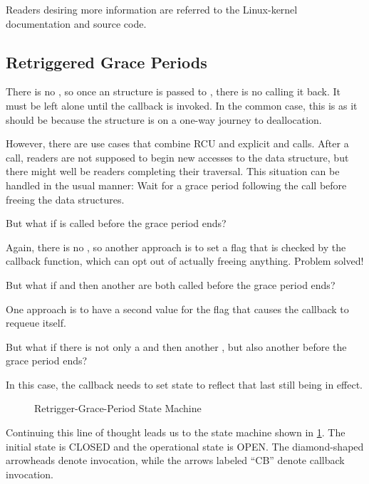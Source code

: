 Readers desiring more  information are referred to
the Linux-kernel documentation and source code.

\subsection{Retriggered Grace Periods}
\label{sec:together:Retriggered Grace Periods}

There is no , so once an  structure
is passed to , there is no calling it back.
It must be left alone until the callback is invoked.
In the common case, this is as it should be because the 
structure is on a one-way journey to deallocation.

However, there are use cases that combine RCU and explicit 
and  calls.
After a  call, readers are not supposed to begin new accesses
to the data structure, but there might well be readers completing their
traversal.
This situation can be handled in the usual manner:
Wait for a grace period following the  call before freeing
the data structures.

But what if  is called before the grace period ends?

Again, there is no , so another approach is to
set a flag that is checked by the callback function, which can opt out
of actually freeing anything.
Problem solved!

But what if  and then another  are both called
before the grace period ends?

One approach is to have a second value for the flag that causes the
callback to requeue itself.

But what if there is not only a  and then another ,
but also another  before the grace period ends?

In this case, the callback needs to set state to reflect that last
 still being in effect.

\begin{figure}
\centering
{}
\caption{Retrigger-Grace-Period State Machine}
\label{fig:count:Retrigger-Grace-Period State Machine}
\end{figure}

Continuing this line of thought leads us to the state machine
shown in \cref{fig:count:Retrigger-Grace-Period State Machine}.
The initial state is CLOSED and the operational state is OPEN\@.
The diamond-shaped arrowheads denote  invocation, while
the arrows labeled ``CB'' denote callback invocation.

